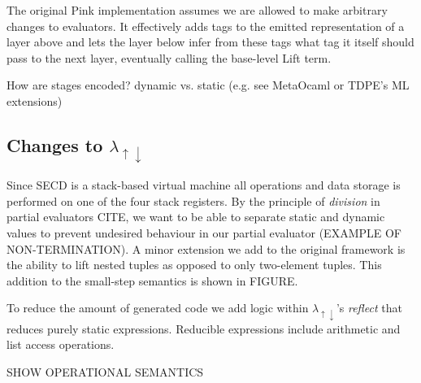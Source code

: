 \documentclass[fleqn]{article}
\theoremstyle{definition}
\newcommand{\mslang}{$\lambda_{\uparrow\downarrow}$}
\begin{document}
The original Pink implementation assumes we are allowed to make arbitrary changes to evaluators. It effectively adds tags to the emitted representation of a layer above and lets the layer below infer from these tags what tag it itself should pass to the next layer, eventually calling the base-level Lift term.

How are stages encoded? dynamic vs. static (e.g. see MetaOcaml or TDPE's ML extensions)

\subsection{Changes to \mslang}
Since SECD is a stack-based virtual machine all operations and data storage is performed on one of the four stack registers. By the principle of \textit{division} in partial evaluators CITE, we want to be able to separate static and dynamic values to prevent undesired behaviour in our partial evaluator (EXAMPLE OF NON-TERMINATION). A minor extension we add to the original framework is the ability to lift nested tuples as opposed to only two-element tuples. This addition to the small-step semantics is shown in FIGURE.

To reduce the amount of generated code we add logic within \mslang's \textit{reflect} that reduces purely static expressions. Reducible expressions include arithmetic and list access operations.

SHOW OPERATIONAL SEMANTICS

\end{document}

